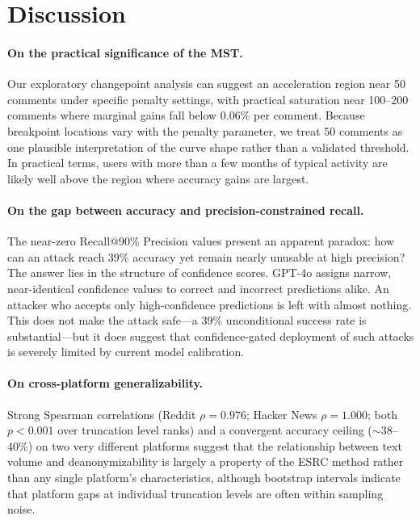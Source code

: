 \documentclass[sigplan,screen,nonacm]{acmart}
\begin{document}
\section{Discussion}


\paragraph{On the practical significance of the MST.}
Our exploratory changepoint analysis can suggest an acceleration region near 50
comments under specific penalty settings, with practical saturation near 100--200
comments where marginal gains fall below 0.06\% per comment. Because breakpoint
locations vary with the penalty parameter, we treat 50 comments as one plausible
interpretation of the curve shape rather than a validated threshold. In practical
terms, users with more than a few months of typical activity are likely well above
the region where accuracy gains are largest.

\paragraph{On the gap between accuracy and precision-constrained recall.}
The near-zero Recall@90\% Precision values present an apparent paradox: how can an
attack reach 39\% accuracy yet remain nearly unusable at high precision? The answer
lies in the structure of confidence scores. GPT-4o assigns narrow, near-identical
confidence values to correct and incorrect predictions alike. An attacker who accepts
only high-confidence predictions is left with almost nothing. This does not make the
attack safe---a 39\% unconditional success rate is substantial---but it does suggest
that confidence-gated deployment of such attacks is severely limited by current model
calibration.

\paragraph{On cross-platform generalizability.}
Strong Spearman correlations (Reddit $\rho = 0.976$; Hacker News $\rho = 1.000$;
both $p < 0.001$ over truncation level ranks) and a convergent accuracy ceiling
($\sim$38--40\%) on two very different platforms suggest that the
relationship between text volume and deanonymizability is largely a property of the
ESRC method rather than any single platform's characteristics, although bootstrap
intervals indicate that platform gaps at individual truncation levels are often
within sampling noise.
\end{document}
